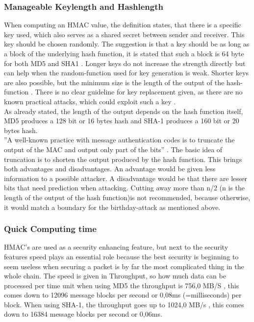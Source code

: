 \subsubsection{Manageable Keylength and Hashlength}
When computing an HMAC value, the definition states, that there is a specific key used, which also serves as a shared secret between sender and receiver. This key should be chosen randomly. The suggestion is that a key should be as long as a block of the underlying hash function, it is stated that such a block is 64 byte for both MD5 and SHA1 \cite{RFC}. Longer keys do not increase the strength directly but can help when the random-function used for key generation is weak. Shorter keys are also possible, but the minimum size is the length of the output of the hash-function \cite{RFC}. There is no clear guideline for key replacement given, as there are no known practical attacks, which could exploit such a key \cite{RFC}. \\
As already stated, the length of the output depends on the hash function itself, MD5 produces a 128 bit or 16 bytes hash and SHA-1 produces a 160 bit or 20 bytes hash. \\
''A well-known practice with message authentication codes is to truncate the output of the MAC and output only part of the bits'' \cite{RFC}. The basic idea of truncation is to shorten the output produced by the hash function. This brings both advantages and disadvantages. An advantage would be given less information to a possible attacker. A disadvantage would be that there are lesser bits that need prediction when attacking. Cutting away more than n/2 (n is the length of the output of the hash function)is not recommended, because otherwise, it would match a boundary for the birthday-attack as mentioned above. 
\subsubsection{Quick Computing time}
HMAC’s are used as a security enhancing feature, but next to the security features speed plays an essential role because the best security is beginning to seem useless when securing a packet is by far the most complicated thing in the whole chain. The speed is given in Throughput, so how much data can be processed per time unit when using MD5 the throughput is 756,0 MB/S \cite{MAX}, this comes down to 12096 message blocks per second or 0,08ms (=milliseconds) per block. When using SHA-1, the throughput goes up to 1024,0 MB/s \cite{MAX}, this comes down to 16384 message blocks per second or 0,06ms.

